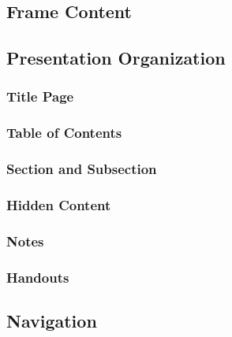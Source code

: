 \documentclass[aspectratio=169,mathserif,8pt,xcolor=table,notes=show]{beamer}
\begin{document}
	\subsection{Frame Content} %
	\label{sub:frame_content}
		\begin{frame}
		\end{frame}
	\subsection{Presentation Organization} %
	\label{sub:presentation_organization}
		\begin{frame}[t]
		\end{frame}
		\subsubsection{Title Page}

		\subsubsection{Table of Contents}

		\subsubsection{Section and Subsection}

		\subsubsection{Hidden Content}

		\subsubsection{Notes}

		\subsubsection{Handouts}

	\subsection{Navigation} %
	\label{sub:navigation}

\end{document}
